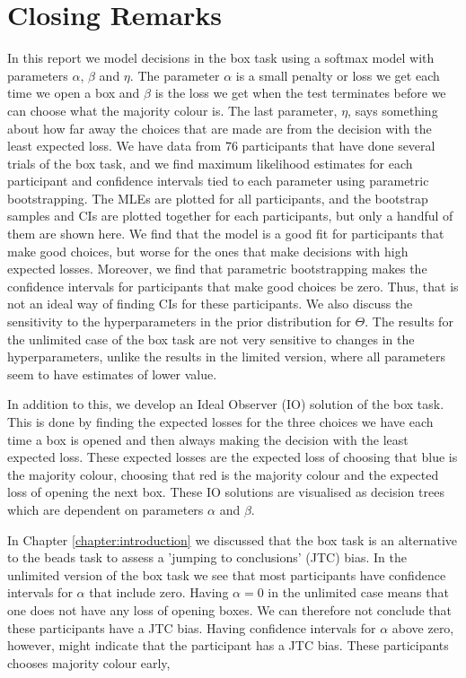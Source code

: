 \chapter{Closing Remarks}
In this report we model decisions in the box task using a softmax model with parameters $\alpha$, $\beta$ and $\eta$. The parameter $\alpha$ is a small penalty or loss we get each time we open a box and $\beta$ is the loss we get when the test terminates before we can choose what the majority colour is. The last parameter, $\eta$, says something about how far away the choices that are made are from the decision with the least expected loss.
We have data from 76 participants that have done several trials of the box task, and we find maximum likelihood estimates for each participant and confidence intervals tied to each parameter using parametric bootstrapping. The MLEs are plotted for all participants, and the bootstrap samples and CIs are plotted together for each participants, but only a handful of them are shown here. 
We find that the model is a good fit for participants that make good choices, but worse for the ones that make decisions with high expected losses. Moreover, we find that parametric bootstrapping makes the confidence intervals for participants that make good choices be zero. Thus, that is not an ideal way of finding CIs for these participants.
We also discuss the sensitivity to the hyperparameters in the prior distribution for $\Theta$. The results for the unlimited case of the box task are not very sensitive to changes in the hyperparameters, unlike the results in the limited version, where all parameters seem to have estimates of lower value. 


In addition to this, we develop an Ideal Observer (IO) solution of the box task. This is done by finding the expected losses for the three choices we have each time a box is opened and then always making the decision with the least expected loss. These expected losses are the expected loss of choosing that blue is the majority colour, choosing that red is the majority colour and the expected loss of opening the next box. These IO solutions are visualised as decision trees which are dependent on parameters $\alpha$ and $\beta$.

In Chapter \ref{chapter:introduction} we discussed that the box task is an alternative to the beads task to assess a 'jumping to conclusions' (JTC) bias. In the unlimited version of the box task we see that most participants have confidence intervals for $\alpha$ that include zero. Having $\alpha=0$ in the unlimited case means that one does not have any loss of opening boxes. We can therefore not conclude that these participants have a JTC bias. Having confidence intervals for $\alpha$ above zero, however, might indicate that the participant has a JTC bias. These participants chooses majority colour early, 

